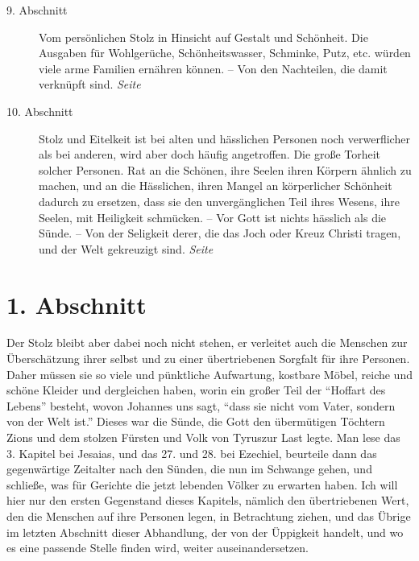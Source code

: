 \begin{description}
\item[9. Abschnitt] Vom persönlichen Stolz in Hinsicht auf Gestalt und
Schönheit. Die Ausgaben für Wohlgerüche, Schönheitswasser, Schminke, Putz, etc.
würden viele arme Familien ernähren können. -- Von den Nachteilen, die damit
verknüpft sind.
\dotfill \textit{Seite~\pageref{kap11_ab9}}\\
\item[10. Abschnitt] Stolz und Eitelkeit ist bei alten und hässlichen Personen
noch verwerflicher als bei anderen, wird aber doch häufig angetroffen. Die große
Torheit solcher Personen. Rat an die Schönen, ihre Seelen ihren Körpern
ähnlich zu machen, und an die Hässlichen, ihren Mangel an körperlicher Schönheit
dadurch zu ersetzen, dass sie den unvergänglichen Teil ihres Wesens, ihre
Seelen, mit Heiligkeit schmücken. -- Vor Gott ist nichts hässlich als die Sünde.
-- Von der Seligkeit derer, die das Joch oder Kreuz Christi tragen, und der Welt
gekreuzigt sind.
\dotfill \textit{Seite~\pageref{kap11_ab10}}\\

\end{description}

\newpage

\section{1. Abschnitt} \label{kap11_ab1}

Der Stolz bleibt aber dabei noch nicht stehen, er verleitet auch die Menschen
zur Überschätzung ihrer selbst und zu einer übertriebenen Sorgfalt für ihre
Personen. Daher müssen sie so viele und pünktliche Aufwartung, kostbare
Möbel,
reiche und schöne Kleider und dergleichen haben, worin ein
großer Teil
der "`Hoffart
des Lebens"' besteht, wovon Johannes uns sagt,
"`dass sie nicht vom Vater,
sondern von der Welt ist."'
Dieses war die Sünde, die Gott
den übermütigen Töchtern Zions und dem stolzen
Fürsten und Volk von Tyruszur
Last legte. Man lese das 3. Kapitel bei Jesaias,
und das 27. und 28. bei
Ezechiel,
beurteile dann das gegenwärtige Zeitalter nach den Sünden, die nun im
Schwange gehen, und schließe, was für Gerichte die jetzt lebenden Völker zu
erwarten haben. Ich will hier nur den ersten Gegenstand dieses Kapitels, nämlich
den übertriebenen Wert, den die Menschen auf ihre Personen legen, in
Betrachtung ziehen, und das Übrige im letzten Abschnitt dieser Abhandlung, der
von der Üppigkeit handelt, und wo es eine passende Stelle finden wird,
weiter auseinandersetzen.

